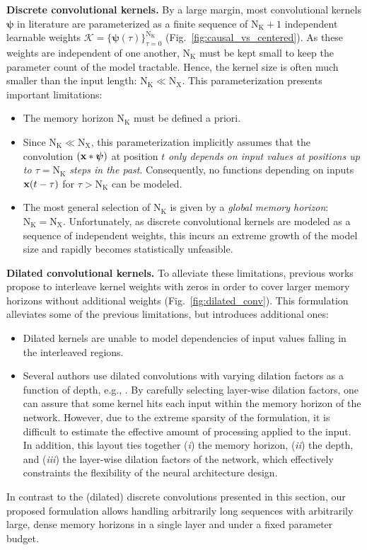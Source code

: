 \documentclass{article}
\def\gK{{\mathcal{K}}}
\renewcommand{\vec}[1]{\ensuremath{\mathbf{\MakeLowercase{{#1}}}}}
\newcommand{\xv}{\vec{x}}
\def\Nt{\mathrm{N}}
\def\Kt{\mathrm{K}}
\def\Xt{\mathrm{X}}
\def\gK{{\mathcal{K}}}
\begin{document}
\textbf{Discrete convolutional kernels.}
By a large margin, most convolutional kernels $\boldsymbol{\psi}$ in literature are parameterized as a finite sequence of $\Nt_{\Kt} + 1$ independent learnable weights $\gK {=} \{ \boldsymbol{\psi}(\tau) \}_{\tau {=} 0}^{\Nt_{\Kt}}$ (Fig.~\ref{fig:causal_vs_centered}). As these weights are independent of one another, $\Nt_{\Kt}$ must be kept small to keep the parameter count of the model tractable. Hence, the kernel size is often much smaller than the input length: $\Nt_{\Kt} \ll \Nt_{\Xt}$. 
This parameterization presents important limitations:
\begin{itemize}[topsep=0pt, leftmargin=*]
\item The memory horizon $\Nt_{\Kt}$ must be defined a priori.
\item Since $\Nt_{\Kt} \ll \Nt_{\Xt}$, this parameterization implicitly assumes that the convolution $(\xv * \boldsymbol{\psi})$ at position $t$ \emph{only depends on input values at positions up to $\tau {=} \Nt_{\Kt}$ steps in the past}. Consequently, no functions depending on inputs $\xv(t-\tau)$ for $\tau > \Nt_{\Kt}$ can be modeled.
\item The most general selection of $\Nt_{\Kt}$ is given by a \textit{global memory horizon}: $\Nt_{\Kt} {=} \Nt_{\Xt}$. Unfortunately, as discrete convolutional kernels are modeled as a sequence of independent weights, this incurs an extreme growth of the model size and rapidly becomes statistically unfeasible.
\end{itemize}
\textbf{Dilated convolutional kernels.}
To alleviate these limitations, previous works propose to interleave kernel weights with zeros in order to cover larger memory horizons without additional weights (Fig.~\ref{fig:dilated_conv}). This formulation alleviates some of the previous limitations, but introduces additional ones:
\begin{itemize}[topsep=0pt, leftmargin=*]
\item Dilated kernels are unable to model dependencies of input values falling in the interleaved regions.\item Several authors use dilated convolutions with varying dilation factors as a function of depth, e.g., \citep{bai2018empirical, dai2017very, oord2016wavenet, romero2020wavelet}. By carefully selecting layer-wise dilation factors, one can assure that some kernel hits each input within the memory horizon of the network. However, due to the extreme sparsity of the formulation, it is difficult to estimate the effective amount of processing applied to the input. In addition, this layout ties together (\textit{i}) the memory horizon, (\textit{ii}) the depth, and (\textit{iii}) the layer-wise dilation factors of the network, which effectively constraints the flexibility of the neural architecture design.
\end{itemize}
In contrast to the (dilated) discrete convolutions presented in this section, our proposed formulation allows handling arbitrarily long sequences with arbitrarily large, dense memory horizons in a single layer and under a fixed parameter budget.
\vspace{-2mm}
\end{document}
